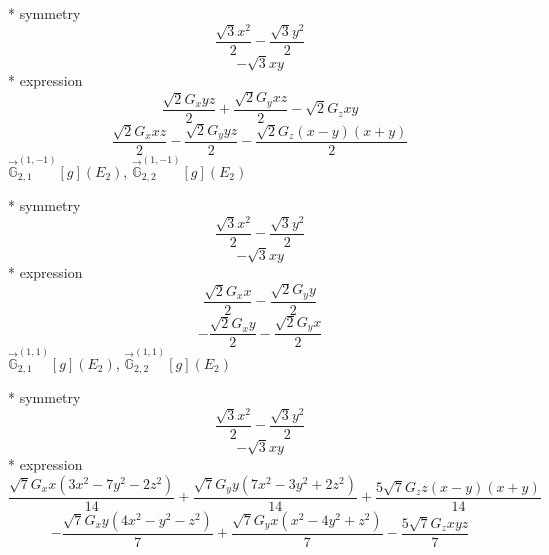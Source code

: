 \documentclass[fleqn,8pt]{jsarticle}
\begin{document}
\noindent\quad ** symmetry
\begin{dmath*}
\frac{\sqrt{3} x^{2}}{2} - \frac{\sqrt{3} y^{2}}{2}
\end{dmath*}
\begin{dmath*}
- \sqrt{3} x y
\end{dmath*}
\noindent\quad ** expression
\begin{dmath*}
\frac{\sqrt{2} G_{x} y z}{2} + \frac{\sqrt{2} G_{y} x z}{2} - \sqrt{2} G_{z} x y
\end{dmath*}
\begin{dmath*}
\frac{\sqrt{2} G_{x} x z}{2} - \frac{\sqrt{2} G_{y} y z}{2} - \frac{\sqrt{2} G_{z} \left(x - y\right) \left(x + y\right)}{2}
\end{dmath*}
\noindent\quad $\vec{\mathbb{G}}_{2,1}^{(1,-1)}[g](E_{2})$, $\vec{\mathbb{G}}_{2,2}^{(1,-1)}[g](E_{2})$

\noindent\quad ** symmetry
\begin{dmath*}
\frac{\sqrt{3} x^{2}}{2} - \frac{\sqrt{3} y^{2}}{2}
\end{dmath*}
\begin{dmath*}
- \sqrt{3} x y
\end{dmath*}
\noindent\quad ** expression
\begin{dmath*}
\frac{\sqrt{2} G_{x} x}{2} - \frac{\sqrt{2} G_{y} y}{2}
\end{dmath*}
\begin{dmath*}
- \frac{\sqrt{2} G_{x} y}{2} - \frac{\sqrt{2} G_{y} x}{2}
\end{dmath*}
\noindent\quad $\vec{\mathbb{G}}_{2,1}^{(1,1)}[g](E_{2})$, $\vec{\mathbb{G}}_{2,2}^{(1,1)}[g](E_{2})$

\noindent\quad ** symmetry
\begin{dmath*}
\frac{\sqrt{3} x^{2}}{2} - \frac{\sqrt{3} y^{2}}{2}
\end{dmath*}
\begin{dmath*}
- \sqrt{3} x y
\end{dmath*}
\noindent\quad ** expression
\begin{dmath*}
\frac{\sqrt{7} G_{x} x \left(3 x^{2} - 7 y^{2} - 2 z^{2}\right)}{14} + \frac{\sqrt{7} G_{y} y \left(7 x^{2} - 3 y^{2} + 2 z^{2}\right)}{14} + \frac{5 \sqrt{7} G_{z} z \left(x - y\right) \left(x + y\right)}{14}
\end{dmath*}
\begin{dmath*}
- \frac{\sqrt{7} G_{x} y \left(4 x^{2} - y^{2} - z^{2}\right)}{7} + \frac{\sqrt{7} G_{y} x \left(x^{2} - 4 y^{2} + z^{2}\right)}{7} - \frac{5 \sqrt{7} G_{z} x y z}{7}
\end{dmath*}
\end{document}

